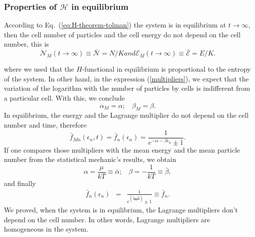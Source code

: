 \subsubsection{Properties of $\mathcal{H}$ in equilibrium}
According to Eq.~(\ref{eq:H-theorem-tolman}) the system is in equilibrium at $t\to\infty$, then 
the cell number of particles and the cell energy do not depend on the cell number, this is 
%
\begin{subequations}
\begin{equation}
   {\mathcal{N}}_M(t\to\infty)\equiv \bar{\mathcal{N}}=N/K
\end{equation}
%
and
%
\begin{equation}
	{\mathcal{E}}_M(t\to\infty)\equiv \bar{\mathcal{E}}=E/K.
\end{equation}
%
\end{subequations}
%

\color{blue}

%

where we used that the $H$-functional in equilibrium is proportional to the
entropy of the system.
In other hand, in the expression (\ref{multipliers}), we expect that the
variation of the logarithm with the number of particles by cells is indifferent
from a particular cell. With this, we conclude 
%
\begin{equation}
    \alpha_M=\alpha; \ \ \ \ \beta_M=\beta.
\end{equation}
%
In equilibrium, the energy and the Lagrange multiplier do not depend on the
cell number and time, therefore
%
\begin{equation}
    \bar f_{Mn}(\epsilon_{n},t)=\bar f_n(\epsilon_{n}) =\frac{1}{e^{-\alpha-\beta \epsilon_n}\pm 1}.
\end{equation}
%
If one compares those multipliers with the mean energy and the mean particle
number from the statistical mechanic's results, we obtain
%
\begin{equation}
    \alpha=\frac{\mu}{kT}\equiv \bar{\alpha}; \ \ \ \ \beta=-\frac{1}{kT}\equiv \bar{\beta},
\end{equation}
%
and finally
%
\begin{eqnarray}
    \bar{f}_{n}(\epsilon_{n})&=&\frac{1}{e^{(\frac{{\epsilon_n}-\bar{\mu}}{kT})}\pm 1}\equiv \bar{f}_{n}.
\end{eqnarray}
%
We proved, when the system is in equilibrium, the Lagrange multipliers don't
depend on the cell number. In other words, Lagrange multipliers are homogeneous
in the system.

